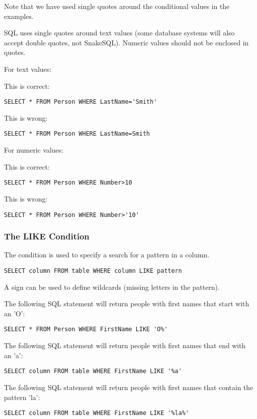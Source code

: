 \documentclass{howto}
\begin{document}
Note that we have used single quotes around the conditional values in the examples.

SQL uses single quotes around text values (some database systems will also accept double quotes, not SnakeSQL). Numeric values should not be enclosed in quotes.

For text values:

This is correct:
\begin{verbatim}
SELECT * FROM Person WHERE LastName='Smith'
\end{verbatim}

This is wrong:
\begin{verbatim}
SELECT * FROM Person WHERE LastName=Smith
\end{verbatim}

For numeric values:

This is correct:
\begin{verbatim}
SELECT * FROM Person WHERE Number>10
\end{verbatim}

This is wrong:
\begin{verbatim}
SELECT * FROM Person WHERE Number>'10'
\end{verbatim}

\subsubsection{The LIKE Condition}

The  condition is used to specify a search for a pattern in a column.

\begin{verbatim}
SELECT column FROM table WHERE column LIKE pattern
\end{verbatim}

A \code{\%} sign can be used to define wildcards (missing letters in the pattern).

The following SQL statement will return people with first names that start with an 'O':
\begin{verbatim}
SELECT * FROM Person WHERE FirstName LIKE 'O%'
\end{verbatim}

The following SQL statement will return people with first names that end with an 'a':
\begin{verbatim}
SELECT column FROM table WHERE FirstName LIKE '%a'
\end{verbatim}

The following SQL statement will return people with first names that contain the pattern 'la':
\begin{verbatim}
SELECT column FROM table WHERE FirstName LIKE '%la%'
\end{verbatim}
\end{document}
